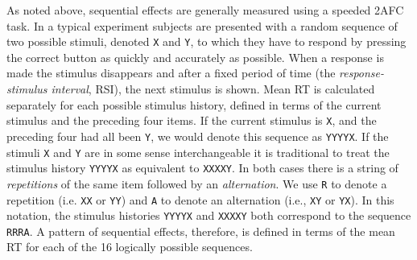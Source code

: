 \documentclass{apa}[12pt]
\newcommand{\stimulus}[1]{\texttt{#1}}
\begin{document}
As noted above, sequential effects are generally measured using a speeded 2AFC task. In a typical experiment subjects are presented with a random sequence of two possible stimuli, denoted \stimulus{X} and \stimulus{Y}, to which they have to respond by pressing the correct button as quickly and accurately as possible. When a response is made the stimulus disappears and after a fixed period of time (the \textit{response-stimulus interval}, RSI), the next stimulus is shown. Mean RT is calculated separately for each possible stimulus history, defined in terms of the current stimulus and the preceding four items. If the current stimulus is \stimulus{X}, and the preceding four had all been \stimulus{Y}, we would denote this sequence as \stimulus{YYYYX}. If the stimuli \stimulus{X} and \stimulus{Y} are in some sense interchangeable it is traditional to treat the stimulus history \stimulus{YYYYX} as equivalent to \stimulus{XXXXY}. In both cases there is a string of {\it repetitions} of the same item followed by an {\it alternation}. We use \stimulus{R} to denote a repetition (i.e. \stimulus{XX} or \stimulus{YY}) and \stimulus{A} to denote an alternation (i.e., \stimulus{XY} or \stimulus{YX}). In this notation, the stimulus histories \stimulus{YYYYX} and \stimulus{XXXXY} both correspond to the sequence \stimulus{RRRA}. A pattern of sequential effects, therefore, is defined in terms of the mean RT for each of the 16 logically possible sequences.
\end{document}
